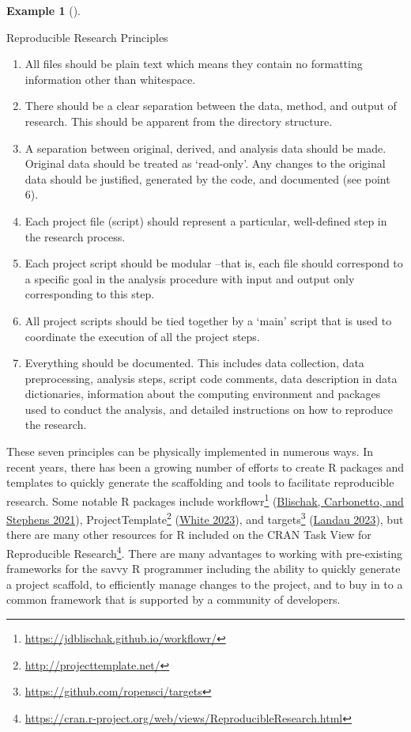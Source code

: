 \documentclass[
  letterpaper,
  DIV=11,
  numbers=noendperiod]{scrreport}
\providecommand{\tightlist}{%
  \setlength{\itemsep}{0pt}\setlength{\parskip}{0pt}}\usepackage{longtable,booktabs,array}
\theoremstyle{definition}
\newtheorem{example}{Example}[chapter]
\theoremstyle{remark}
\DeclareRobustCommand{\href}[2]{#2\footnote{\url{#1}}}
\begin{document}
\begin{example}[]\protect\hypertarget{exm-fr-repro-principles}{}\label{exm-fr-repro-principles}

Reproducible Research Principles

\begin{enumerate}
\def\labelenumi{\arabic{enumi}.}
\tightlist
\item
  All files should be plain text which means they contain no formatting
  information other than whitespace.
\item
  There should be a clear separation between the data, method, and
  output of research. This should be apparent from the directory
  structure.
\item
  A separation between original, derived, and analysis data should be
  made. Original data should be treated as `read-only'. Any changes to
  the original data should be justified, generated by the code, and
  documented (see point 6).
\item
  Each project file (script) should represent a particular, well-defined
  step in the research process.
\item
  Each project script should be modular --that is, each file should
  correspond to a specific goal in the analysis procedure with input and
  output only corresponding to this step.
\item
  All project scripts should be tied together by a `main' script that is
  used to coordinate the execution of all the project steps.
\item
  Everything should be documented. This includes data collection, data
  preprocessing, analysis steps, script code comments, data description
  in data dictionaries, information about the computing environment and
  packages used to conduct the analysis, and detailed instructions on
  how to reproduce the research.
\end{enumerate}

\end{example}

These seven principles can be physically implemented in numerous ways.
In recent years, there has been a growing number of efforts to create R
packages and templates to quickly generate the scaffolding and tools to
facilitate reproducible research. Some notable R packages include
\href{https://jdblischak.github.io/workflowr/}{workflowr}
(\protect\hyperlink{ref-R-workflowr}{Blischak, Carbonetto, and Stephens
2021}), \href{http://projecttemplate.net/}{ProjectTemplate}
(\protect\hyperlink{ref-R-ProjectTemplate}{White 2023}), and
\href{https://github.com/ropensci/targets}{targets}
(\protect\hyperlink{ref-R-targets}{Landau 2023}), but there are many
other resources for R included on the
\href{https://cran.r-project.org/web/views/ReproducibleResearch.html}{CRAN
Task View for Reproducible Research}. There are many advantages to
working with pre-existing frameworks for the savvy R programmer
including the ability to quickly generate a project scaffold, to
efficiently manage changes to the project, and to buy in to a common
framework that is supported by a community of developers.
\end{document}
